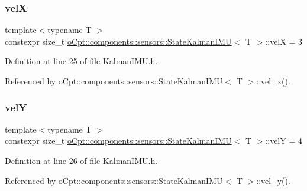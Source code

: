 \subsubsection{\texorpdfstring{velX}{velX}}
{\footnotesize\ttfamily template$<$typename T $>$ \\
constexpr size\+\_\+t \hyperlink{classo_cpt_1_1components_1_1sensors_1_1_state_kalman_i_m_u}{o\+Cpt\+::components\+::sensors\+::\+State\+Kalman\+I\+MU}$<$ T $>$\+::velX = 3\hspace{0.3cm}{\ttfamily [static]}}



Definition at line 25 of file Kalman\+I\+M\+U.\+h.



Referenced by o\+Cpt\+::components\+::sensors\+::\+State\+Kalman\+I\+M\+U$<$ T $>$\+::vel\+\_\+x().

\hypertarget{classo_cpt_1_1components_1_1sensors_1_1_state_kalman_i_m_u_a3a6ea2f74eae7f16a73c539deb0645ee}{}\label{classo_cpt_1_1components_1_1sensors_1_1_state_kalman_i_m_u_a3a6ea2f74eae7f16a73c539deb0645ee} 
\subsubsection{\texorpdfstring{velY}{velY}}
{\footnotesize\ttfamily template$<$typename T $>$ \\
constexpr size\+\_\+t \hyperlink{classo_cpt_1_1components_1_1sensors_1_1_state_kalman_i_m_u}{o\+Cpt\+::components\+::sensors\+::\+State\+Kalman\+I\+MU}$<$ T $>$\+::velY = 4\hspace{0.3cm}{\ttfamily [static]}}



Definition at line 26 of file Kalman\+I\+M\+U.\+h.



Referenced by o\+Cpt\+::components\+::sensors\+::\+State\+Kalman\+I\+M\+U$<$ T $>$\+::vel\+\_\+y().

\hypertarget{classo_cpt_1_1components_1_1sensors_1_1_state_kalman_i_m_u_af7d5e8203d4a3278463d368dd07817e6}{}\label{classo_cpt_1_1components_1_1sensors_1_1_state_kalman_i_m_u_af7d5e8203d4a3278463d368dd07817e6} 
